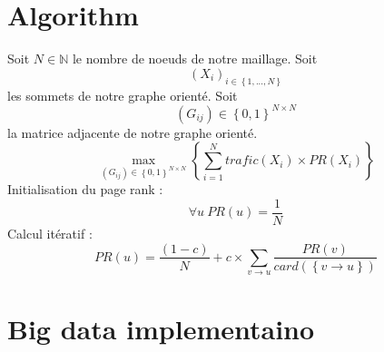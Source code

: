 \documentclass{iSWAGArticle}
\begin{document}
\section{Algorithm}
Soit $N \in \mathbb{N}$ le nombre de noeuds de notre maillage.
Soit $$\left(X_i\right)_{i \in \left\{1,...,N\right\}}$$ les sommets de notre graphe orienté.
Soit $$\left(G_{ij}\right)  \in \left\{0,1\right\}^{N\times N}$$ la matrice adjacente de notre graphe orienté.
\begin{equation}
\max_{\left(G_{ij}\right)  \in \left\{0,1\right\}^{N\times N}}\left\{ \sum^{N}_{i=1} trafic\left(X_i\right)\times PR(X_i)\right\}
\end{equation} 
Initialisation du page rank :
\begin{equation}
\forall u \ PR\left(u\right)=\frac{1}{N}
\end{equation} 
Calcul itératif :
\begin{equation}
PR\left(u\right)= \frac{\left(1-c\right)}{N} + c \times \sum_{v \rightarrow u}\frac{PR\left(v\right)}{card\left(\left\{v\rightarrow u\right\}\right)}
\end{equation}
\section{Big data implementaino}



\end{document}
